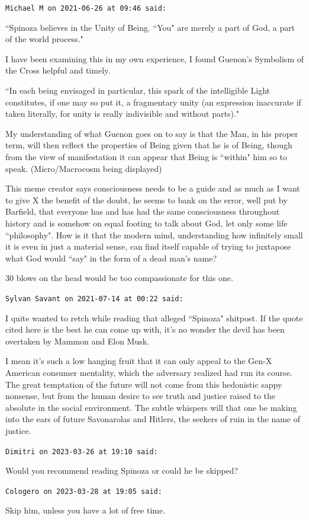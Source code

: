 \begin{footnotesize}\begin{sffamily}



\texttt{Michael M on 2021-06-26 at 09:46 said: }

``Spinoza believes in the Unity of Being. ``You" are merely a part of God, a part of the world process."

I have been examining this in my own experience, I found Guenon's Symbolism of the Cross helpful and timely.

``In each being envisaged in particular, this spark of the intelligible Light constitutes, if one may so put it, a fragmentary unity (an expression inaccurate if taken literally, for unity is really indivisible and without parts)."

My understanding of what Guenon goes on to say is that the Man, in his proper term, will then reflect the properties of Being given that he is of Being, though from the view of manifestation it can appear that Being is ``within" him so to speak. (Micro/Macrocosm being displayed)

This meme creator says consciousness needs to be a guide and as much as I want to give X the benefit of the doubt, he seems to bank on the error, well put by Barfield, that everyone has and has had the same consciousness throughout history and is somehow on equal footing to talk about God, let only some life ``philosophy". How is it that the modern mind, understanding how infinitely small it is even in just a material sense, can find itself capable of trying to juxtapose what God would ``say" in the form of a dead man's name?

30 blows on the head would be too compassionate for this one.


\hfill

\texttt{Sylvan Savant on 2021-07-14 at 00:22 said: }

I quite wanted to retch while reading that alleged ``Spinoza" shitpost. If the quote cited here is the best he can come up with, it's no wonder the devil has been overtaken by Mammon and Elon Musk.

I mean it's such a low hanging fruit that it can only appeal to the Gen-X American consumer mentality, which the adversary realized had run its course. The great temptation of the future will not come from this hedonistic sappy nonsense, but from the human desire to see truth and justice raised to the absolute in the social environment. The subtle whispers will that one be making into the ears of future Savonarolas and Hitlers, the seekers of ruin in the name of justice.


\hfill

\texttt{Dimitri on 2023-03-26 at 19:10 said: }

Would you recommend reading Spinoza or could he be skipped?


\hfill

\texttt{Cologero on 2023-03-28 at 19:05 said: }

Skip him, unless you have a lot of free time.


\end{sffamily}\end{footnotesize}

